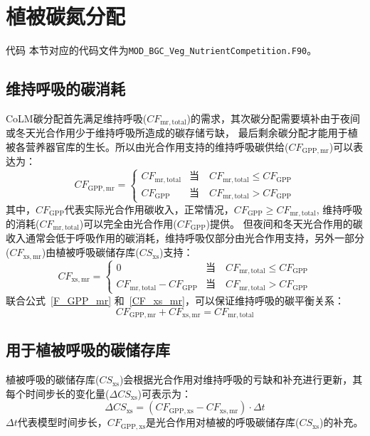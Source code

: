 \section{植被碳氮分配}\label{植被碳氮分配}
\begin{mymdframed}{代码}
  本节对应的代码文件为\texttt{MOD\_BGC\_Veg\_NutrientCompetition.F90}。
\end{mymdframed}
\subsection{维持呼吸的碳消耗}
CoLM碳分配首先满足维持呼吸($CF_{\mathrm{mr,total}}$)的需求，其次碳分配需要填补由于夜间或冬天光合作用少于维持呼吸所造成的碳存储亏缺，
最后剩余碳分配才能用于植被各营养器官库的生长。所以由光合作用支持的维持呼吸碳供给($CF_{\mathrm{GPP,mr}}$)可以表达为：
\begin{equation}\label{F_GPP_mr}
  CF_{\mathrm{GPP,mr}}=\left\{\begin{array}{cl}CF_{\mathrm{mr, total}} & \text{当}\quad CF_{\mathrm{mr, total}} \leqslant CF_{\mathrm{GPP}} \\ CF_{\mathrm{GPP}} & \text{当}\quad CF_{\mathrm{mr,total}}>CF_{\mathrm{GPP}} \end{array}\right.
\end{equation}
其中，$CF_{\mathrm{GPP}}$代表实际光合作用碳收入，正常情况，$CF_{\mathrm{GPP}}\geq CF_{\mathrm{mr,total}}$,
维持呼吸的消耗($CF_{\mathrm{mr,total}}$)可以完全由光合作用($CF_{\mathrm{GPP}}$)提供。
但夜间和冬天光合作用的碳收入通常会低于呼吸作用的碳消耗，维持呼吸仅部分由光合作用支持，另外一部分($CF_{\mathrm{xs,mr}}$)由植被呼吸碳储存库($CS_{\mathrm{xs}}$)支持：
\begin{equation}\label{CF_xs_mr}
  CF_{\mathrm{xs, mr}}=\left\{\begin{array}{cl}0 & \text{当}\quad CF_{\mathrm{mr, total}} \leqslant CF_{\mathrm{GPP}} \\ CF_{\mathrm{mr, total}}-CF_{\mathrm{GPP}} & \text{当}\quad CF_{\mathrm{mr, total}}>CF_{\mathrm{GPP}}\end{array}\right.
\end{equation}
联合公式~\eqref{F_GPP_mr} 和~\eqref{CF_xs_mr}，可以保证维持呼吸的碳平衡关系：
\begin{equation}
  CF_{\mathrm{GPP, mr}}+CF_{\mathrm{xs, mr}}=CF_{\mathrm{mr, total}}
\end{equation}


\subsection{用于植被呼吸的碳储存库}
植被呼吸的碳储存库($CS_{\mathrm{xs}}$)会根据光合作用对维持呼吸的亏缺和补充进行更新，其每个时间步长的变化量($\Delta CS_{\mathrm{xs}}$)可表示为：
\begin{equation}
  \Delta CS_{\mathrm{xs}}=\left(CF_{\mathrm{GPP, xs}}-CF_{\mathrm{xs, mr}}\right) \cdot \Delta t
\end{equation}
$\Delta t$代表模型时间步长，$CF_{\mathrm{GPP,xs}}$是光合作用对植被的呼吸碳储存库($CS_{\mathrm{xs}}$)的补充。

